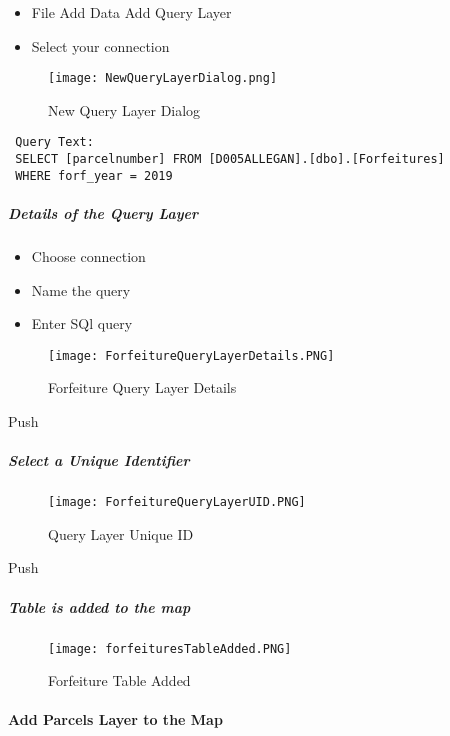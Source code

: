  \begin{itemize}
 \setlength\itemsep{.2in}
 \item {\Large File {\menuArrow} Add Data {\menuArrow} Add Query Layer}
 \item {\Large Select your connection}
 \end{itemize}
 \begin{figure}[h!]
 \centering
     \texttt{[image: NewQueryLayerDialog.png]}
 \caption{New Query Layer Dialog}
 \end{figure}
 \begin{verbatim}
 Query Text:
 SELECT [parcelnumber] FROM [D005ALLEGAN].[dbo].[Forfeitures]
 WHERE forf_year = 2019
 \end{verbatim}
 \clearpage
 \subparagraph{Details of the Query Layer}
 \begin{itemize}
 \item Choose connection
 \item Name the query
 \item Enter SQl query
\end{itemize}
 \begin{figure}[h!]
 \centering
     \texttt{[image: ForfeitureQueryLayerDetails.PNG]}
 \caption{Forfeiture Query Layer Details}
 \end{figure}
{\bigbtn Push }
 \clearpage
 \subparagraph{Select a Unique Identifier}
 \begin{figure}[h!]
 \centering
     \texttt{[image: ForfeitureQueryLayerUID.PNG]}
 \caption{Query Layer Unique ID}
 \end{figure}

{\bigbtn Push }

 \clearpage
 \subparagraph*{Table is added to the map}
 \begin{figure}[h!]
 \centering
     \texttt{[image: forfeituresTableAdded.PNG]}
 \caption{Forfeiture Table Added}
 \end{figure}
 \clearpage
 \paragraph{Add Parcels Layer to the Map}
 \vspace{.3in}

